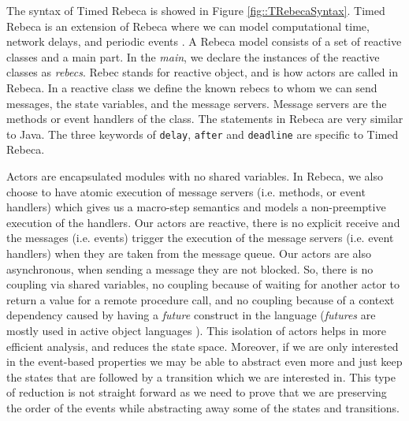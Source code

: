 The syntax of Timed Rebeca is showed in Figure \ref{fig::TRebecaSyntax}.
Timed Rebeca is an extension of Rebeca where we can model computational time, network delays, and periodic events \cite{DBLP:journals/scp/ReynissonSACJIS14,DBLP:conf/birthday/SirjaniK16}.
%
A Rebeca model consists of a set of reactive classes and a main part. In the \textit{main}, we declare the instances of the reactive classes as \textit{rebecs}. Rebec stands for reactive object, and is how actors are called in Rebeca. In a reactive class we define the known rebecs to whom we can send messages, the state variables, and the message servers. Message servers are the methods or event handlers of the class. The statements in Rebeca are very similar to Java.
The three keywords of \texttt{delay}, \texttt{after} and \texttt{deadline} are specific to Timed Rebeca.


Actors are encapsulated modules with no shared variables. In Rebeca, we also choose to have atomic execution of message servers (i.e. methods, or event handlers) which gives us a macro-step semantics and models a non-preemptive execution of the handlers.
Our actors are reactive, there is no explicit receive and the messages (i.e. events) trigger the execution of the message servers (i.e. event handlers) when they are taken from the message queue.  Our actors are also asynchronous, when sending a message they are not blocked. 
So, there is no coupling via shared variables, no coupling because of waiting for another actor to return a value for a remote procedure call, and no coupling because of a context dependency caused by having a \textit{future}  construct in the language (\textit{futures} are mostly used in active object languages \cite{DBLP:journals/csur/BoerSHHRDJSKFY17}).
This isolation of actors helps in more efficient analysis, and reduces the state space.
Moreover, if we are only interested in the event-based properties we may be able to abstract even more and just keep the states that are followed by a transition which we are interested in. This type of reduction is not straight forward as we need to prove that we are preserving the order of the events while abstracting away some of the states and transitions. 

